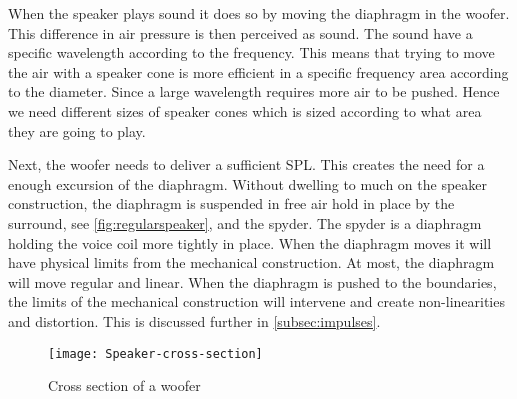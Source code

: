 When the speaker plays sound it does so by moving the diaphragm in the woofer. This difference in air pressure is then perceived as sound. The sound have a specific wavelength according to the frequency. This means that trying to move the air with a speaker cone is more efficient in a specific frequency area according to the diameter. %
Since a large wavelength requires more air to be pushed. Hence we need different sizes of speaker cones which is sized according to what area they are going to play.

Next, the woofer needs to deliver a sufficient \gls{SPL}. This creates the need for a enough excursion of the diaphragm. Without dwelling to much on the speaker construction, the diaphragm is suspended in free air hold in place by the surround, see \autoref{fig:regularspeaker}, and the spyder. The spyder is a diaphragm holding the voice coil more tightly in place. When the diaphragm moves it will have physical limits from the mechanical construction. At most, the diaphragm will move regular and linear. When the diaphragm is pushed to the boundaries, the limits of the mechanical construction will intervene and create non-linearities and distortion. This is discussed further in \autoref{subsec:impulses}.

\begin{figure}
\centering
\texttt{[image: Speaker-cross-section]}
\caption{Cross section of a woofer}
\label{fig:louderspeakerCrossSection}
\end{figure}



